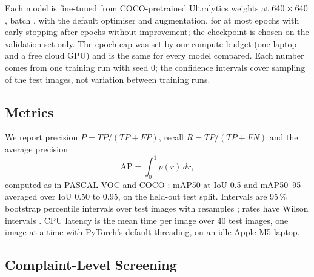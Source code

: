 \documentclass{ieeeaccess}
\begin{document}
Each model is fine-tuned from COCO-pretrained Ultralytics weights at $640\times640$, batch \nBatch, with the default optimiser and augmentation, for at most \nMaxEpochs{} epochs with early stopping after \nPatience{} epochs without improvement; the checkpoint is chosen on the validation set only. The epoch cap was set by our compute budget (one laptop and a free cloud GPU) and is the same for every model compared. Each number comes from one training run with seed 0; the confidence intervals cover sampling of the test images, not variation between training runs.

\subsection{Metrics}

We report precision $P=TP/(TP+FP)$, recall $R=TP/(TP+FN)$ and the average precision
\begin{equation}
\mathrm{AP}=\int_{0}^{1} p(r)\,dr,
\label{eq:ap}
\end{equation}
\noindent computed as in PASCAL VOC \cite{b54} and COCO \cite{b55}: mAP50 at IoU 0.5 and mAP50--95 averaged over IoU 0.50 to 0.95, on the held-out test split. Intervals are 95\,\% bootstrap percentile intervals over test images with \nBootstrap{} resamples \cite{b59}; rates have Wilson intervals \cite{b60}. CPU latency is the mean time per image over 40 test images, one image at a time with PyTorch's default threading, on an idle Apple M5 laptop.

\subsection{Complaint-Level Screening}
\end{document}
